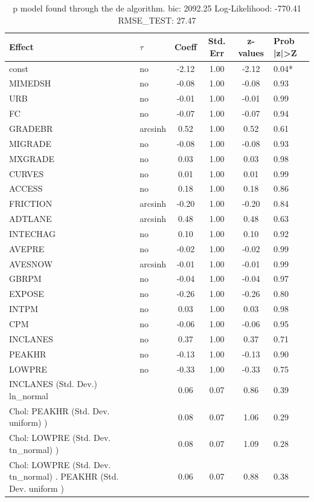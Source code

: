 \begin{table}
	\caption{p model found through the de algorithm. bic: 2092.25 Log-Likelihood: -770.41 RMSE_TEST: 27.47}
	\begin{center}
		\begin{tabular}{|l|l|c|c|c|l|}
			\hline
			Effect & $\tau$ & Coeff & Std. Err & z-values & Prob |z|>Z \\
			\hline
			const & no & -2.12 & 1.00 & -2.12 & 0.04* \\
			\hline
			MIMEDSH & no & -0.08 & 1.00 & -0.08 & 0.93 \\
			\hline
			URB & no & -0.01 & 1.00 & -0.01 & 0.99 \\
			\hline
			FC & no & -0.07 & 1.00 & -0.07 & 0.94 \\
			\hline
			GRADEBR & arcsinh & 0.52 & 1.00 & 0.52 & 0.61 \\
			\hline
			MIGRADE & no & -0.08 & 1.00 & -0.08 & 0.93 \\
			\hline
			MXGRADE & no & 0.03 & 1.00 & 0.03 & 0.98 \\
			\hline
			CURVES & no & 0.01 & 1.00 & 0.01 & 0.99 \\
			\hline
			ACCESS & no & 0.18 & 1.00 & 0.18 & 0.86 \\
			\hline
			FRICTION & arcsinh & -0.20 & 1.00 & -0.20 & 0.84 \\
			\hline
			ADTLANE & arcsinh & 0.48 & 1.00 & 0.48 & 0.63 \\
			\hline
			INTECHAG & no & 0.10 & 1.00 & 0.10 & 0.92 \\
			\hline
			AVEPRE & no & -0.02 & 1.00 & -0.02 & 0.99 \\
			\hline
			AVESNOW & arcsinh & -0.01 & 1.00 & -0.01 & 0.99 \\
			\hline
			GBRPM & no & -0.04 & 1.00 & -0.04 & 0.97 \\
			\hline
			EXPOSE & no & -0.26 & 1.00 & -0.26 & 0.80 \\
			\hline
			INTPM & no & 0.03 & 1.00 & 0.03 & 0.98 \\
			\hline
			CPM & no & -0.06 & 1.00 & -0.06 & 0.95 \\
			\hline
			INCLANES & no & 0.37 & 1.00 & 0.37 & 0.71 \\
			\hline
			PEAKHR & no & -0.13 & 1.00 & -0.13 & 0.90 \\
			\hline
			LOWPRE & no & -0.33 & 1.00 & -0.33 & 0.75 \\
			\hline
			INCLANES (Std. Dev.) ln_normal &  & 0.06 & 0.07 & 0.86 & 0.39 \\
			\hline
			 Chol: PEAKHR (Std. Dev. uniform) ) &  & 0.08 & 0.07 & 1.06 & 0.29 \\
			\hline
			 Chol: LOWPRE (Std. Dev. tn_normal) ) &  & 0.08 & 0.07 & 1.09 & 0.28 \\
			\hline
			 Chol: LOWPRE (Std. Dev. tn_normal) . PEAKHR (Std. Dev.   uniform ) &  & 0.06 & 0.07 & 0.88 & 0.38 \\
			\hline
		\end{tabular}
	\end{center}
\end{table}